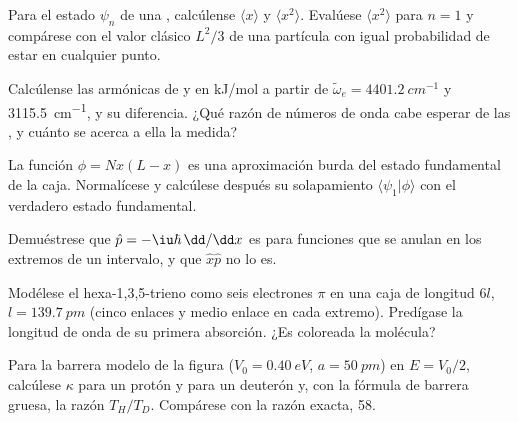 \begin{exercise}[$\star\star$]\label{exo:b3:quantum-model-systems:5}
Para el estado $\psi_n$ de una , calcúlense $\langle x\rangle$ y
$\langle x^2\rangle$. Evalúese $\langle x^2\rangle$ para $n = 1$ y compárese con
el valor clásico $L^2/3$ de una partícula con igual probabilidad de estar en cualquier punto.
\end{exercise}

\begin{exercise}[$\star\star$]\label{exo:b3:quantum-model-systems:6}
Calcúlense las  armónicas de  y  en
\unit{kJ/mol} a partir de $\tilde\omega_e = \qty{4401.2}{cm^{-1}}$ y
\qty{3115.5}{cm^{-1}}, y su diferencia. ¿Qué razón de números de onda cabe
esperar de las , y cuánto se acerca a ella la medida?
\end{exercise}

\begin{exercise}[$\star\star$]\label{exo:b3:quantum-model-systems:7}
La función $\phi = Nx(L - x)$ es una aproximación burda del estado fundamental de la
caja. Normalícese y calcúlese después su solapamiento $\langle\psi_1|\phi\rangle$ con
el verdadero estado fundamental.
\end{exercise}

\begin{exercise}[$\star\star$]\label{exo:b3:quantum-model-systems:8}
Demuéstrese que $\hat p = -\iu\hbar\,\dd/\dd x$ es  para funciones que
se anulan en los extremos de un intervalo, y que $\hat x\hat p$ no lo es.
\end{exercise}

\begin{exercise}[$\star\star$]\label{exo:b3:quantum-model-systems:9}
Modélese el hexa-1,3,5-trieno como seis electrones $\pi$ en una caja de longitud $6l$, $l =
\qty{139.7}{pm}$ (cinco enlaces y medio enlace en cada extremo). Predígase la
longitud de onda de su primera absorción. ¿Es coloreada la molécula?
\end{exercise}

\begin{exercise}[$\star\star\star$]\label{exo:b3:quantum-model-systems:10}
Para la barrera modelo de la figura ($V_0 = \qty{0.40}{eV}$, $a = \qty{50}{pm}$)
en $E = V_0/2$, calcúlese $\kappa$ para un protón y para un deuterón y, con la
fórmula de barrera gruesa, la razón $T_H/T_D$. Compárese con la razón exacta, 58.
\end{exercise}

